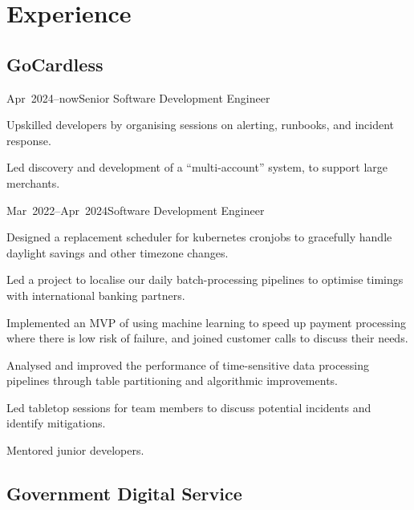 \documentclass[a4paper]{barrucadu-cv}
\newcommand{\range}[2]{#1–#2}
\newcommand{\orange}[1]{\range{#1}{now}}
\begin{document}
\section{Experience}

\subsection{GoCardless}
\begin{cventry}{\orange{Apr~2024}}{Senior Software Development Engineer}
  \begin{tightitemize}
  \item Upskilled developers by organising sessions on alerting, runbooks, and incident response.
  \item Led discovery and development of a ``multi-account'' system, to support large merchants.
  \end{tightitemize}
\end{cventry}

\begin{cventry}{\range{Mar~2022}{Apr~2024}}{Software Development Engineer}
  \begin{tightitemize}
  \item Designed a replacement scheduler for kubernetes cronjobs to gracefully handle daylight savings and other timezone changes.
  \item Led a project to localise our daily batch-processing pipelines to optimise timings with international banking partners.
  \item Implemented an MVP of using machine learning to speed up payment processing where there is low risk of failure, and joined customer calls to discuss their needs.
  \item Analysed and improved the performance of time-sensitive data processing pipelines through table partitioning and algorithmic improvements.
  \item Led tabletop sessions for team members to discuss potential incidents and identify mitigations.
  \item Mentored junior developers.
  \end{tightitemize}
\end{cventry}

\subsection{Government Digital Service}
\end{document}
